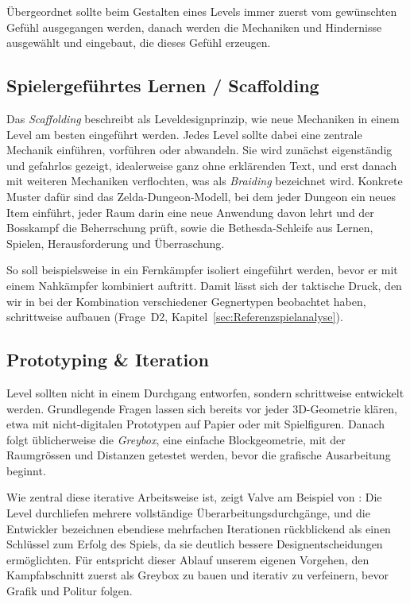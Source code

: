 \documentclass[../Main.tex]{subfiles}
\begin{document}
Übergeordnet sollte beim Gestalten eines Levels immer zuerst vom gewünschten Gefühl ausgegangen werden, danach werden die Mechaniken und Hindernisse ausgewählt und eingebaut, die dieses Gefühl erzeugen.\autocite{gdc_tenprinciples2010}

\subsection{Spielergeführtes Lernen / Scaffolding} \label{sec:Scaffolding}
Das \textit{Scaffolding} beschreibt als Leveldesignprinzip, wie neue Mechaniken in einem Level am besten eingeführt werden.\autocite[114]{totten2014architectural} Jedes Level sollte dabei eine zentrale Mechanik einführen, vorführen oder abwandeln.\autocite{gdc_tenprinciples2010} Sie wird zunächst eigenständig und gefahrlos gezeigt, idealerweise ganz ohne erklärenden Text, und erst danach mit weiteren Mechaniken verflochten, was als \textit{Braiding} bezeichnet wird.\autocite{gdc_movingmountains2020} Konkrete Muster dafür sind das Zelda-Dungeon-Modell, bei dem jeder Dungeon ein neues Item einführt, jeder Raum darin eine neue Anwendung davon lehrt und der Bosskampf die Beherrschung prüft, sowie die Bethesda-Schleife aus Lernen, Spielen, Herausforderung und Überraschung.\autocite{gdc_tenprinciples2010}

So soll beispielsweise in  ein Fernkämpfer isoliert eingeführt werden, bevor er mit einem Nahkämpfer kombiniert auftritt. Damit lässt sich der taktische Druck, den wir in  bei der Kombination verschiedener Gegnertypen beobachtet haben, schrittweise aufbauen (Frage~D2, Kapitel~\ref{sec:Referenzspielanalyse}).

\subsection{Prototyping \& Iteration} \label{sec:Prototyping}
Level sollten nicht in einem Durchgang entworfen, sondern schrittweise entwickelt werden. Grundlegende Fragen lassen sich bereits vor jeder 3D-Geometrie klären, etwa mit nicht-digitalen Prototypen auf Papier oder mit Spielfiguren. Danach folgt üblicherweise die \textit{Greybox}, eine einfache Blockgeometrie, mit der Raumgrössen und Distanzen getestet werden, bevor die grafische Ausarbeitung beginnt.\autocite[124--126]{totten2014architectural}

Wie zentral diese iterative Arbeitsweise ist, zeigt Valve am Beispiel von \autocite{valve_halflife2_2004}: Die Level durchliefen mehrere vollständige Überarbeitungsdurchgänge, und die Entwickler bezeichnen ebendiese mehrfachen Iterationen rückblickend als einen Schlüssel zum Erfolg des Spiels, da sie deutlich bessere Designentscheidungen ermöglichten.\autocite{jacobson2005postmortem} Für  entspricht dieser Ablauf unserem eigenen Vorgehen, den Kampfabschnitt zuerst als Greybox zu bauen und iterativ zu verfeinern, bevor Grafik und Politur folgen.
\end{document}
